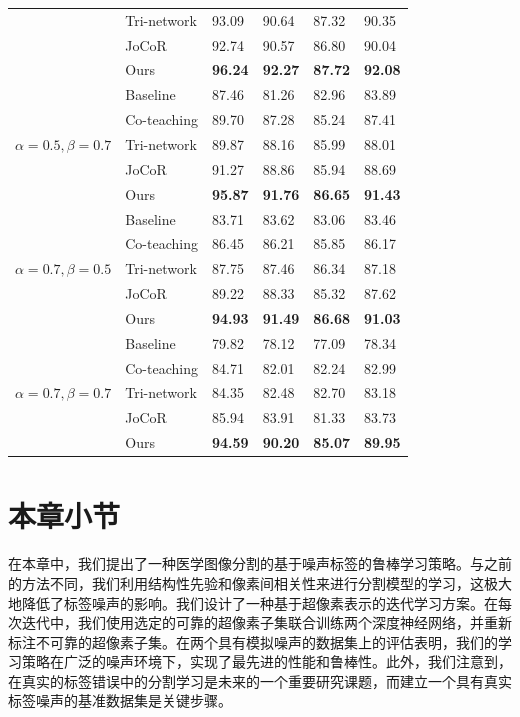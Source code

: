\begin{table}[thb]
{\begin{tabular}{P{3.0cm}|M{3.0cm}|M{2.0cm}|M{2.0cm}|M{2.0cm}|M{2.0cm}}
                & Tri-network  & 93.09  &90.64   &87.32   & 90.35   \\ 
                & JoCoR  & 92.74  &90.57    &86.80   & 90.04  \\ 
                & Ours  &\textbf{96.24 }  &\textbf{92.27}   &\textbf{87.72}   &  \textbf{92.08}  \\ \midrule
                & Baseline  &87.46   &81.26   &82.96   & 83.89   \\ 
                & Co-teaching  &89.70   &87.28   &85.24   & 87.41   \\ 
                & Tri-network  &89.87   &88.16   &85.99   & 88.01   \\ 
                & JoCoR  &91.27   &88.86   &85.94   & 88.69   \\ 
                & Ours  &\textbf{95.87 }  &\textbf{91.76}   &\textbf{86.65}   &  \textbf{91.43}  \\ \midrule
                & Baseline  &83.71   &83.62   &83.06   & 83.46   \\ 
                & Co-teaching  &86.45   & 86.21  &85.85  & 86.17   \\ 
                & Tri-network  &87.75   & 87.46   &86.34   & 87.18   \\ 
                & JoCoR  &89.22   &88.33   &85.32   & 87.62   \\ 
                & Ours  &\textbf{94.93 }  &\textbf{91.49}   &\textbf{86.68}   &  \textbf{91.03}   \\ \midrule
                & Baseline  &79.82   &78.12   &77.09   & 78.34   \\ 
                & Co-teaching  &84.71   &82.01   &82.24   & 82.99   \\ 
                & Tri-network  &84.35   &82.48   &82.70   & 83.18   \\ 
                & JoCoR  &85.94   &83.91   &81.33   & 83.73   \\ 
                & Ours  &\textbf{94.59}   &\textbf{90.20}   &\textbf{85.07}   &  \textbf{89.95}  \\ 
                \bottomrule
            \end{tabular}
        }
    \end{table}



\section{本章小节}
在本章中，我们提出了一种医学图像分割的基于噪声标签的鲁棒学习策略。与之前的方法不同，我们利用结构性先验和像素间相关性来进行分割模型的学习，这极大地降低了标签噪声的影响。我们设计了一种基于超像素表示的迭代学习方案。在每次迭代中，我们使用选定的可靠的超像素子集联合训练两个深度神经网络，并重新标注不可靠的超像素子集。在两个具有模拟噪声的数据集上的评估表明，我们的学习策略在广泛的噪声环境下，实现了最先进的性能和鲁棒性。此外，我们注意到，在真实的标签错误中的分割学习是未来的一个重要研究课题，而建立一个具有真实标签噪声的基准数据集是关键步骤。